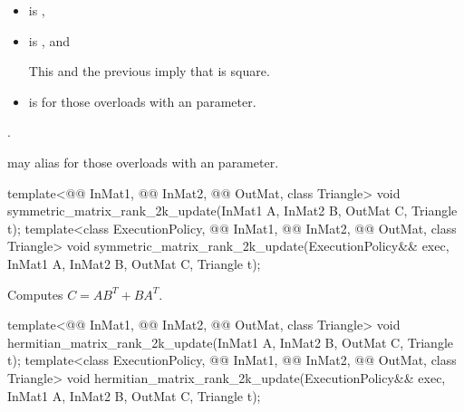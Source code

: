 \pnum
\expects
\begin{itemize}
\item
{}
is ,
\item
{}
is , and
\begin{note}
This and the previous imply that  is square.
\end{note}
\item
{}
is  for those overloads with an  parameter.
\end{itemize}

\pnum
\complexity
{}.

\pnum
\remarks
{} may alias  for those overloads with an  parameter.

%
\begin{itemdecl}
template<@@ InMat1, @@ InMat2,
         @@ OutMat, class Triangle>
  void symmetric_matrix_rank_2k_update(InMat1 A, InMat2 B, OutMat C, Triangle t);
template<class ExecutionPolicy, @@ InMat1, @@ InMat2,
         @@ OutMat, class Triangle>
  void symmetric_matrix_rank_2k_update(ExecutionPolicy&& exec,
                                       InMat1 A, InMat2 B, OutMat C, Triangle t);
\end{itemdecl}

\begin{itemdescr}
\pnum
\effects
Computes $C = A B^T + B A^T$.
\end{itemdescr}

%
\begin{itemdecl}
template<@@ InMat1, @@ InMat2,
         @@ OutMat, class Triangle>
  void hermitian_matrix_rank_2k_update(InMat1 A, InMat2 B, OutMat C, Triangle t);
template<class ExecutionPolicy,
         @@ InMat1, @@ InMat2,
         @@ OutMat, class Triangle>
  void hermitian_matrix_rank_2k_update(ExecutionPolicy&& exec,
                                       InMat1 A, InMat2 B, OutMat C, Triangle t);
\end{itemdecl}

